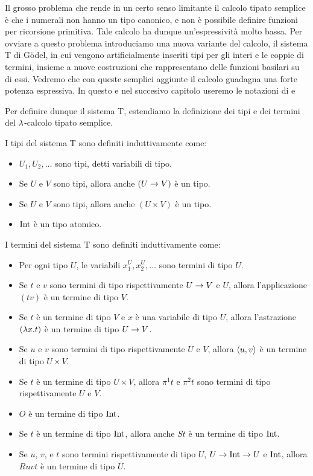 \documentclass[]{marticle}
\begin{document}
Il grosso problema che rende in un certo senso limitante il calcolo tipato
semplice \`e che i numerali non hanno un tipo canonico, e non \`e possibile
definire funzioni per ricorsione primitiva.  Tale calcolo ha dunque
un'espressivit\`a molto bassa.  Per ovviare a questo problema introduciamo una
nuova variante del calcolo, il sistema T di G\"odel, in cui vengono
artificialmente inseriti tipi per gli interi e le coppie di termini, insieme a
nuove costruzioni che rappresentano delle funzioni basilari su di essi.  Vedremo
che con queste semplici aggiunte il calcolo guadagna una forte potenza
espressiva. In questo e nel succesivo capitolo useremo le notazioni di
\cite{girard} e \cite{sorenses}

Per definire dunque il sistema T, estendiamo la definizione dei tipi e dei
termini del $\lambda$-calcolo tipato semplice. 
\begin{block}[Definizione]
    I tipi del sistema T sono definiti induttivamente come:
    \begin{itemize}
        \item $U_1, U_2, \dots$ sono tipi, detti variabili di tipo.
        \item Se $U$ e $V$ sono tipi, allora anche $(U\rightarrow V)$ \`e un tipo.
        \item Se $U$ e $V$ sono tipi, allora anche $(U\times V)$ \`e un tipo.
        \item $\text{Int}$ \`e un tipo atomico.
    \end{itemize}

    I termini del sistema T sono definiti induttivamente come:
    \begin{itemize}
        \item Per ogni tipo $U$, le variabili $x^U_1, x^U_2, \dots$ sono termini
            di tipo $U$.
        \item Se $t$ e $v$ sono termini di tipo rispettivamente $U\rightarrow V$ e $U$,
            allora l'applicazione $(tv)$ \`e un termine di tipo $V$.
        \item Se $t$ \`e un termine di tipo $V$ e $x$ \`e una variabile di tipo
            $U$, allora l'astrazione $(\lambda x.  t)$ \`e un termine di tipo $U\rightarrow
            V$.
        \item Se $u$ e $v$ sono termini di tipo rispettivamente $U$ e $V$,
            allora $\langle u,v \rangle$ \`e un termine di tipo $U\times V$.
        \item Se $t$ \`e un termine di tipo $U\times V$, allora $\pi^1 t$ e
            $\pi^2t$ sono termini di tipo rispettivamente $U$ e $V$.
        \item $O$ \`e un termine di tipo $\text{Int}$.
        \item Se $t$ \`e un termine di tipo $\text{Int}$, allora anche $St$ \`e un
            termine di tipo $\text{Int}$.
        \item Se $u$, $v$, e $t$ sono termini rispettivamente di tipo $U$,
            $U\rightarrow \text{Int}\rightarrow U$ e $\text{Int}$, allora $Ruvt$ \`e un termine di
            tipo $U$.
    \end{itemize}
\end{block}
\end{document}
